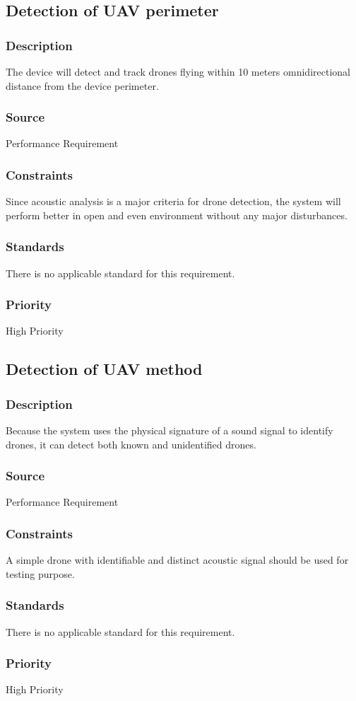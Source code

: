 \subsection{Detection of UAV perimeter}
\subsubsection{Description}
The device will detect and track drones flying within 10 meters omnidirectional distance from the device perimeter.
\subsubsection{Source}
Performance Requirement
\subsubsection{Constraints}
Since acoustic analysis is a major criteria for drone detection, the system will perform better in open and even environment without any major disturbances.
\subsubsection{Standards}
There is no applicable standard for this requirement.
\subsubsection{Priority}
High Priority

\subsection{Detection of UAV method}
\subsubsection{Description}
Because the system uses the physical signature of a sound signal to identify drones, it can detect both known and unidentified drones.
\subsubsection{Source}
Performance Requirement
\subsubsection{Constraints}
A simple drone with identifiable and distinct acoustic signal should be used for testing purpose.
\subsubsection{Standards}
There is no applicable standard for this requirement.
\subsubsection{Priority}
High Priority
